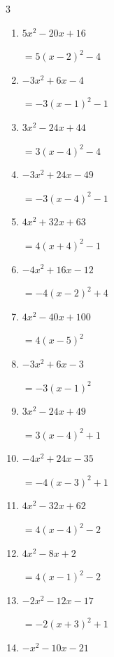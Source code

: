 \begin{multicols}{3}
\begin{enumerate}
  \itemsep=30pt
  \item $5x^{2}-20x+16$

        $=5\left( x-2\right)^{2}-4$

  \item $-3x^{2}+6x-4$

        $=-3\left( x-1\right)^{2}-1$

  \item $3x^{2}-24x+44$

        $=3\left( x-4\right)^{2}-4$

  \item $-3x^{2}+24x-49$

        $=-3\left( x-4\right)^{2}-1$

  \item $4x^{2}+32x+63$

        $=4\left( x+4\right)^{2}-1$

  \item $-4x^{2}+16x-12$

        $=-4\left( x-2\right)^{2}+4$

  \item $4x^{2}-40x+100$

        $=4\left( x-5\right)^{2}$

  \item $-3x^{2}+6x-3$

        $=-3\left( x-1\right)^{2}$

  \item $3x^{2}-24x+49$

        $=3\left( x-4\right)^{2}+1$

  \item $-4x^{2}+24x-35$

        $=-4\left( x-3\right)^{2}+1$

\columnbreak %

  \item $4x^{2}-32x+62$

        $=4\left( x-4\right)^{2}-2$

  \item $4x^{2}-8x+2$

        $=4\left( x-1\right)^{2}-2$

  \item $-2x^{2}-12x-17$

        $=-2\left( x+3\right)^{2}+1$

  \item $-x^{2}-10x-21$


\end{enumerate}
\end{multicols}
